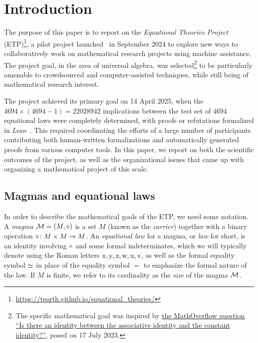 \section{Introduction}

The purpose of this paper is to report on the \emph{Equational Theories Project} (ETP)\footnote{\url{https://teorth.github.io/equational_theories/}}, a pilot project launched~\cite{Tao_blog_Sep_2024} in September 2024 to explore new ways to collaboratively work on mathematical research projects using machine assistance. The project goal, in the area of universal algebra, was selected\footnote{The specific mathematical goal was inspired by \href{https://mathoverflow.net/questions/450930}{the MathOverflow question ``Is there an identity between the associative identity and the constant identity?''}, posed on 17 July 2023.} to be particularly amenable to crowdsourced and computer-assisted techniques, while still being of mathematical research interest.

The project achieved its primary goal on 14 April 2025, when the $\num{4694} \times (\num{4694}-1) = \num{22028942}$ implications between the test set of $\num{4694}$ equational laws were completely determined, with proofs or refutations formalized in \emph{Lean}~\cite{the_lean4_paper}.  This required coordinating the efforts of a large number of participants contributing both human-written formalizations and automatically generated proofs from various computer tools.  In this paper, we report on both the scientific outcomes of the project, as well as the organizational issues that came up with organizing a mathematical project of this scale.

\subsection{Magmas and equational laws}

In order to describe the mathematical goals of the ETP, we need some notation. A \emph{magma} ${\mathcal{M}} = (M,\diamond)$ is a set $M$ (known as the \emph{carrier}) together with a binary operation $\diamond \colon M \times M \to M$. An \emph{equational law} for a magma, or \emph{law} for short, is an identity involving $\diamond$ and some formal indeterminates, which we will typically denote using the Roman letters $\mathrm{x},\mathrm{y},\mathrm{z},\mathrm{w},\mathrm{u},\mathrm{v}$, as well as the formal equality symbol $\simeq$ in place of the equality symbol $=$ to emphasize the formal nature of the law.  If $M$ is finite, we refer to its cardinality as the \emph{size} of the magma ${\mathcal{M}}$.

